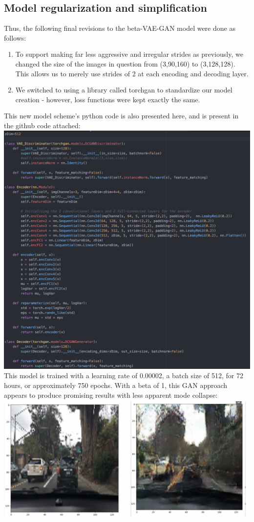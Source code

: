 \documentclass{article}
\begin{document}
\subsection{Model regularization and simplification}
Thus, the following final revisions to the beta-VAE-GAN model were done as follows:
\begin{enumerate}
    \item To support making far less aggressive and irregular strides as previously, we changed the size of the images in question from (3,90,160) to (3,128,128). This allows us to merely use strides of 2 at each encoding and decoding layer.
    \item We switched to using a library called torchgan to standardize our model creation - however, loss functions were kept exactly the same.
\end{enumerate}
This new model scheme's python code is also presented here, and is present in the github code attached: \\
\includegraphics[scale=0.5]{model2.png} \\
This model is trained with a learning rate of 0.00002, a batch size of 512, for 72 hours, or approximately 750 epochs. 
With a beta of 1, this GAN approach appears to produce promising results with less apparent mode collapse: \\ 
\includegraphics[scale=0.5]{results2.png} \\
\end{document}
